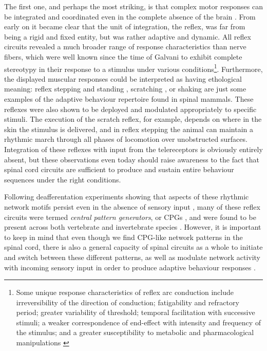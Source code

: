 The first one, and perhaps the most striking, is that complex motor responses can be integrated and coordinated even in the complete absence of the brain \cite{Sherrington1906}. From early on it became clear that the unit of integration, the reflex, was far from being a rigid and fixed entity, but was rather adaptive and dynamic. All reflex circuits revealed a much broader range of response characteristics than nerve fibers, which were well known since the time of Galvani to exhibit complete stereotypy in their response to a stimulus under various conditions\footnote{Some unique response characteristics of reflex arc conduction include irreversibility of the direction of conduction; fatigability and refractory period; greater variability of threshold; temporal facilitation with successive stimuli; a weaker correspondence of end-effect with intensity and frequency of the stimulus; and a greater susceptibility to metabolic and pharmacological manipulations \cite[p.14]{Sherrington1906}}. Furthermore, the displayed muscular responses could be interpreted as having ethological meaning: reflex stepping and standing \cite{Sherrington1910, Sherrington1915}, scratching \cite{Sherrington1903}, or shaking \cite{Goltz1896, Sherrington1903} are just some examples of the adaptive behaviour repertoire found in spinal mammals. These reflexes were also shown to be deployed and modulated appropriately to specific stimuli. The execution of the scratch reflex, for example, depends on where in the skin the stimulus is delivered, and in reflex stepping the animal can maintain a rhythmic march through all phases of locomotion over unobstructed surfaces. Integration of these reflexes with input from the telereceptors is obviously entirely absent, but these observations even today should raise awareness to the fact that spinal cord circuits are sufficient to produce and sustain entire behaviour sequences under the right conditions.

Following deafferentation experiments showing that aspects of these rhythmic network motifs persist even in the absence of sensory input \cite{GrahamBrown1911}, many of these reflex circuits were termed \emph{central pattern generators}, or CPGs \cite{Grillner1975, Grillner1981}, and were found to be present across both vertebrate and invertebrate species \cite{Orlovsky1999,Selverston2010}. However, it is important to keep in mind that even though we find CPG-like network patterns in the spinal cord, there is also a general capacity of spinal circuits as a whole to initiate and switch between these different patterns, as well as modulate network activity with incoming sensory input in order to produce adaptive behaviour responses \cite{Forssberg1975}.

